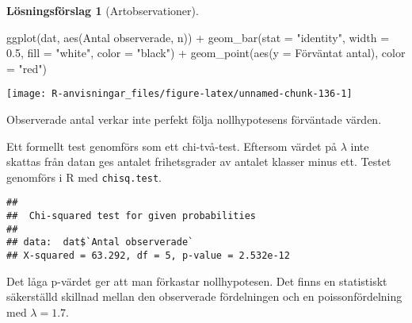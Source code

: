 \documentclass[
]{book}
\newenvironment{Shaded}{\begin{snugshade}}{\end{snugshade}}
\newcommand{\AttributeTok}[1]{\textcolor[rgb]{0.77,0.63,0.00}{#1}}
\newcommand{\FloatTok}[1]{\textcolor[rgb]{0.00,0.00,0.81}{#1}}
\newcommand{\FunctionTok}[1]{\textcolor[rgb]{0.00,0.00,0.00}{#1}}
\newcommand{\NormalTok}[1]{#1}
\newcommand{\SpecialCharTok}[1]{\textcolor[rgb]{0.00,0.00,0.00}{#1}}
\newcommand{\StringTok}[1]{\textcolor[rgb]{0.31,0.60,0.02}{#1}}
\theoremstyle{definition}
\theoremstyle{definition}
\theoremstyle{definition}
\theoremstyle{definition}
\newtheorem{hypothesis}{Lösningsförslag}[chapter]
\theoremstyle{remark}
\begin{document}
\begin{hypothesis}[Artobservationer]
\begin{Shaded}
\begin{Highlighting}[]
\FunctionTok{ggplot}\NormalTok{(dat, }\FunctionTok{aes}\NormalTok{(}\StringTok{\textasciigrave{}}\AttributeTok{Antal observerade}\StringTok{\textasciigrave{}}\NormalTok{, n)) }\SpecialCharTok{+}
  \FunctionTok{geom\_bar}\NormalTok{(}\AttributeTok{stat =} \StringTok{"identity"}\NormalTok{, }\AttributeTok{width =} \FloatTok{0.5}\NormalTok{, }
           \AttributeTok{fill =} \StringTok{"white"}\NormalTok{, }\AttributeTok{color =} \StringTok{"black"}\NormalTok{) }\SpecialCharTok{+}
  \FunctionTok{geom\_point}\NormalTok{(}\FunctionTok{aes}\NormalTok{(}\AttributeTok{y =} \StringTok{\textasciigrave{}}\AttributeTok{Förväntat antal}\StringTok{\textasciigrave{}}\NormalTok{), }\AttributeTok{color =} \StringTok{"red"}\NormalTok{)}
\end{Highlighting}
\end{Shaded}

\begin{center}\texttt{[image: R-anvisningar\_files/figure-latex/unnamed-chunk-136-1]} \end{center}

Observerade antal verkar inte perfekt följa nollhypotesens förväntade värden.

Ett formellt test genomförs som ett chi-två-test. Eftersom värdet på \(\lambda\) inte skattas från datan ges antalet frihetsgrader av antalet klasser minus ett. Testet genomförs i R med \texttt{chisq.test}.

\begin{Shaded}
\end{Shaded}

\begin{verbatim}
## 
##  Chi-squared test for given probabilities
## 
## data:  dat$`Antal observerade`
## X-squared = 63.292, df = 5, p-value = 2.532e-12
\end{verbatim}

Det låga p-värdet ger att man förkastar nollhypotesen. Det finns en statistiskt säkerställd skillnad mellan den observerade fördelningen och en poissonfördelning med \(\lambda = 1.7\).
\end{hypothesis}
\end{document}

